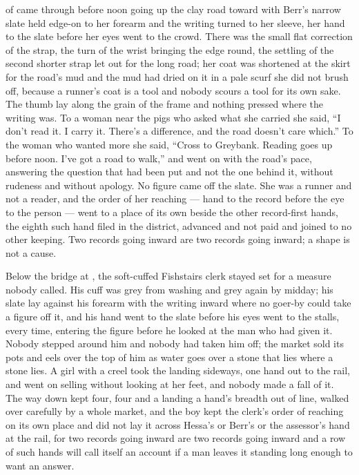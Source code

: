  of  came through before noon going up the clay road toward  with Berr's narrow slate held edge-on to her forearm and the writing turned to her sleeve, her hand to the slate before her eyes went to the crowd. There was the small flat correction of the strap, the turn of the wrist bringing the edge round, the settling of the second shorter strap let out for the long road; her coat was shortened at the skirt for the road's mud and the mud had dried on it in a pale scurf she did not brush off, because a runner's coat is a tool and nobody scours a tool for its own sake. The thumb lay along the grain of the frame and nothing pressed where the writing was. To a woman near the pigs who asked what she carried she said, “I don't read it. I carry it. There's a difference, and the road doesn't care which.” To the woman who wanted more she said, “Cross to Greybank. Reading goes up before noon. I've got a road to walk,” and went on with the road's pace, answering the question that had been put and not the one behind it, without rudeness and without apology. No figure came off the slate. She was a runner and not a reader, and the order of her reaching --- hand to the record before the eye to the person --- went to a place of its own beside the other record-first hands, the eighth such hand filed in the district, advanced and not paid and joined to no other keeping. Two records going inward are two records going inward; a shape is not a cause.

Below the bridge at , the soft-cuffed Fishstairs clerk stayed set for a measure nobody called. His cuff was grey from washing and grey again by midday; his slate lay against his forearm with the writing inward where no goer-by could take a figure off it, and his hand went to the slate before his eyes went to the stalls, every time, entering the figure before he looked at the man who had given it. Nobody stepped around him and nobody had taken him off; the market sold its pots and eels over the top of him as water goes over a stone that lies where a stone lies. A girl with a creel took the landing sideways, one hand out to the rail, and went on selling without looking at her feet, and nobody made a fall of it. The way down kept four, four and a landing a hand's breadth out of line, walked over carefully by a whole market, and the boy kept the clerk's order of reaching on its own place and did not lay it across Hessa's or Berr's or the assessor's hand at the rail, for two records going inward are two records going inward and a row of such hands will call itself an account if a man leaves it standing long enough to want an answer.

